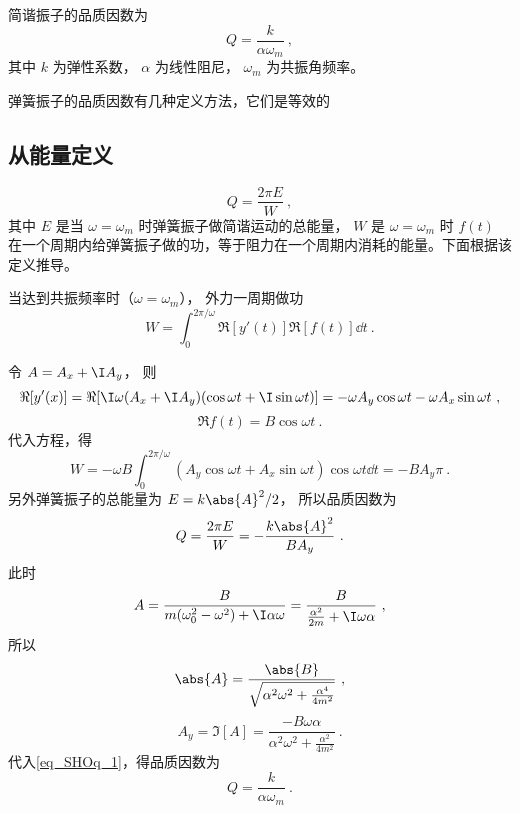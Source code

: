 

简谐振子的品质因数为
\begin{equation}
Q = \frac{k}{\alpha \omega_m}~,
\end{equation}
其中 $k$ 为弹性系数， $\alpha$ 为线性阻尼， $\omega_m$ 为共振角频率。

弹簧振子的品质因数有几种定义方法，它们是等效的

\subsection{从能量定义}
\begin{equation}
Q = \frac{2\pi E}{W}~,
\end{equation}
其中 $E$ 是当 $\omega = \omega_m$ 时弹簧振子做简谐运动的总能量， $W$ 是 $\omega = \omega_m$ 时 $f(t)$ 在一个周期内给弹簧振子做的功，等于阻力在一个周期内消耗的能量。下面根据该定义推导。

当达到共振频率时（$\omega = \omega_m$）， 外力一周期做功
\begin{equation}
W = \int_0^{2\pi/\omega} \Re[y'(t)] \Re[f(t)] \dd{t}~.
\end{equation}

令 $A = A_x + \I A_y$， 则
\begin{equation}
\Re[y'(x)] = \Re[\I\omega (A_x + \I A_y)(\cos\omega t + \I \sin\omega t)] = -\omega A_y \cos\omega t - \omega A_x \sin\omega t~,
\end{equation}
\begin{equation}
\Re f(t) = B\cos \omega t~.
\end{equation}
代入方程，得
\begin{equation}
W = -\omega B \int_0^{2\pi/\omega} (A_y \cos\omega t + A_x \sin\omega t) \cos\omega t \dd{t} = -B A_y \pi~.
\end{equation}
另外弹簧振子的总能量为 $E = k\abs{A}^2/2$， 所以品质因数为
\begin{equation}\label{eq_SHOq_1}
Q = \frac{2\pi E}{W} = -\frac{k\abs{A}^2}{B A_y}~.
\end{equation}
此时
\begin{equation}
A = \frac{B}{m(\omega_0^2 - \omega^2) + \I \alpha\omega} = \frac{B}{\frac{\alpha^2}{2m} + \I\omega \alpha}~,
\end{equation}
所以
\begin{equation}
\abs{A} = \frac{\abs{B}}{\sqrt{\alpha^2\omega^2 + \frac{\alpha^4}{4m^2}}}~,
\end{equation}
\begin{equation}
A_y = \Im[A] = \frac{-B\omega\alpha}{\alpha^2\omega^2 + \frac{\alpha^2}{4m^2}}~.
\end{equation}
代入\autoref{eq_SHOq_1}，得品质因数为
\begin{equation}
Q = \frac{k}{\alpha\omega_m}~.
\end{equation}

